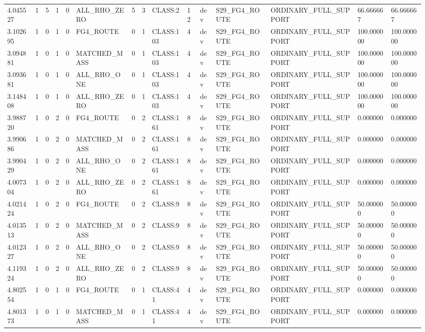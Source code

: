 \begin{tabular}{lllllllllllllll}
4.045527 & 1 & 5 & 1 & 0 & ALL\_RHO\_ZERO & 5 & 3 & CLASS:2 & 12 & dev & S29\_FG4\_ROUTE & ORDINARY\_FULL\_SUPPORT & 66.666667 & 66.666667 \\
3.102695 & 1 & 0 & 1 & 0 & FG4\_ROUTE & 0 & 1 & CLASS:103 & 4 & dev & S29\_FG4\_ROUTE & ORDINARY\_FULL\_SUPPORT & 100.000000 & 100.000000 \\
3.094881 & 1 & 0 & 1 & 0 & MATCHED\_MASS & 0 & 1 & CLASS:103 & 4 & dev & S29\_FG4\_ROUTE & ORDINARY\_FULL\_SUPPORT & 100.000000 & 100.000000 \\
3.093681 & 1 & 0 & 1 & 0 & ALL\_RHO\_ONE & 0 & 1 & CLASS:103 & 4 & dev & S29\_FG4\_ROUTE & ORDINARY\_FULL\_SUPPORT & 100.000000 & 100.000000 \\
3.148408 & 1 & 0 & 1 & 0 & ALL\_RHO\_ZERO & 0 & 1 & CLASS:103 & 4 & dev & S29\_FG4\_ROUTE & ORDINARY\_FULL\_SUPPORT & 100.000000 & 100.000000 \\
3.988720 & 1 & 0 & 2 & 0 & FG4\_ROUTE & 0 & 2 & CLASS:161 & 8 & dev & S29\_FG4\_ROUTE & ORDINARY\_FULL\_SUPPORT & 0.000000 & 0.000000 \\
3.990686 & 1 & 0 & 2 & 0 & MATCHED\_MASS & 0 & 2 & CLASS:161 & 8 & dev & S29\_FG4\_ROUTE & ORDINARY\_FULL\_SUPPORT & 0.000000 & 0.000000 \\
3.990429 & 1 & 0 & 2 & 0 & ALL\_RHO\_ONE & 0 & 2 & CLASS:161 & 8 & dev & S29\_FG4\_ROUTE & ORDINARY\_FULL\_SUPPORT & 0.000000 & 0.000000 \\
4.007304 & 1 & 0 & 2 & 0 & ALL\_RHO\_ZERO & 0 & 2 & CLASS:161 & 8 & dev & S29\_FG4\_ROUTE & ORDINARY\_FULL\_SUPPORT & 0.000000 & 0.000000 \\
4.021424 & 1 & 0 & 2 & 0 & FG4\_ROUTE & 0 & 2 & CLASS:9 & 8 & dev & S29\_FG4\_ROUTE & ORDINARY\_FULL\_SUPPORT & 50.000000 & 50.000000 \\
4.013513 & 1 & 0 & 2 & 0 & MATCHED\_MASS & 0 & 2 & CLASS:9 & 8 & dev & S29\_FG4\_ROUTE & ORDINARY\_FULL\_SUPPORT & 50.000000 & 50.000000 \\
4.012327 & 1 & 0 & 2 & 0 & ALL\_RHO\_ONE & 0 & 2 & CLASS:9 & 8 & dev & S29\_FG4\_ROUTE & ORDINARY\_FULL\_SUPPORT & 50.000000 & 50.000000 \\
4.119324 & 1 & 0 & 2 & 0 & ALL\_RHO\_ZERO & 0 & 2 & CLASS:9 & 8 & dev & S29\_FG4\_ROUTE & ORDINARY\_FULL\_SUPPORT & 50.000000 & 50.000000 \\
4.802554 & 1 & 0 & 1 & 0 & FG4\_ROUTE & 0 & 1 & CLASS:41 & 4 & dev & S29\_FG4\_ROUTE & ORDINARY\_FULL\_SUPPORT & 0.000000 & 0.000000 \\
4.801373 & 1 & 0 & 1 & 0 & MATCHED\_MASS & 0 & 1 & CLASS:41 & 4 & dev & S29\_FG4\_ROUTE & ORDINARY\_FULL\_SUPPORT & 0.000000 & 0.000000 \\

\end{tabular}
